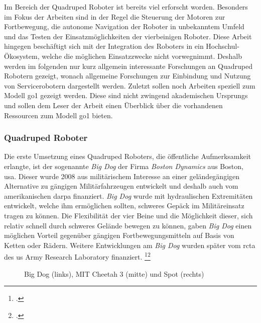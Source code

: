 Im Bereich der Quadruped Roboter ist bereits viel erforscht worden.
Besonders im Fokus der Arbeiten sind in der Regel die Steuerung der Motoren zur Fortbewegung, die autonome Navigation
der Roboter in unbekanntem Umfeld und das Testen der Einsatzmöglichkeiten der vierbeinigen Roboter.
Diese Arbeit hingegen beschäftigt sich mit der Integration des Roboters in ein Hochschul-Ökosystem, welche die möglichen Einsatzzwecke
nicht vorwegnimmt.
Deshalb werden im folgenden nur kurz allgemein interessante Forschungen an Quadruped Robotern gezeigt, wonach
allgemeine Forschungen zur Einbindung und Nutzung von Servicerobotern dargestellt werden.
Zuletzt sollen noch Arbeiten speziell zum Modell \gls{go1} gezeigt werden.
Diese sind nicht zwingend akademischen Ursprungs und sollen dem Leser der Arbeit einen Überblick über die vorhandenen
Ressourcen zum Modell \gls{go1} bieten.

\subsubsection{Quadruped Roboter}
\label{subsubsec:quadruped-roboter}
Die erste Umsetzung eines Quadruped Roboters, die öffentliche Aufmerksamkeit erlangte, ist der sogenannte \emph{Big Dog}
der Firma \emph{Boston Dynamics} aus Boston, \gls{usa}.
Dieser wurde \num{2008} aus militärischem Interesse an einer geländegängigen Alternative zu gängigen Militärfahrzeugen entwickelt und
deshalb auch vom amerikanischen \gls{darpa} finanziert. \emph{Big Dog} wurde mit hydraulischen Extremitäten entwickelt, welche ihm ermöglichen sollten,
schweres Gepäck im Militäreinsatz tragen zu können.
Die Flexibilität der vier Beine und die Möglichkeit dieser, sich relativ schnell durch schweres Gelände bewegen zu können,
gaben \emph{Big Dog} einen möglichen Vorteil gegenüber gängigen Fortbewegungsmitteln auf Basis von Ketten oder Rädern.
Weitere Entwicklungen am \emph{Big Dog} wurden später vom \gls{rcta} des \gls{us} Army Research Laboratory finanziert.
\footcite{bigdog}\footcite{darpa_bigdog}

\begin{figure}[h]
    \caption[Big Dog (links), MIT Cheetah 3 (mitte) und Spot (rechts)]{Big Dog (links), MIT Cheetah 3 (mitte) und Spot (rechts)\footnotemark}\label{fig:doggos}
\end{figure}

